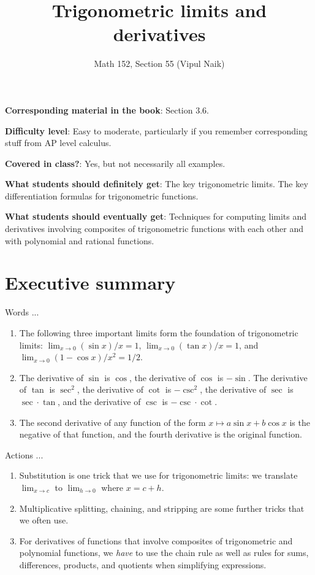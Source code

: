 \documentclass[10pt]{amsart}
\title{Trigonometric limits and derivatives}
\author{Math 152, Section 55 (Vipul Naik)}
\begin{document}
\maketitle

{\bf Corresponding material in the book}: Section 3.6.

{\bf Difficulty level}: Easy to moderate, particularly if you remember
corresponding stuff from AP level calculus.

{\bf Covered in class?}: Yes, but not necessarily all examples.

{\bf What students should definitely get}: The key trigonometric
limits. The key differentiation formulas for trigonometric functions.

{\bf What students should eventually get}: Techniques for computing
limits and derivatives involving composites of trigonometric functions
with each other and with polynomial and rational functions.

\section*{Executive summary}

Words ...

\begin{enumerate}
\item The following three important limits form the foundation of
  trigonometric limits: $\lim_{x \to 0} (\sin x)/x = 1$, $\lim_{x \to
  0} (\tan x)/x = 1$, and $\lim_{x \to 0} (1 - \cos x)/x^2 = 1/2$.
\item The derivative of $\sin$ is $\cos$, the derivative of $\cos$ is
  $-\sin$. The derivative of $\tan$ is $\sec^2$, the derivative of
  $\cot$ is $-\csc^2$, the derivative of $\sec$ is $\sec \cdot \tan$,
  and the derivative of $\csc$ is $-\csc \cdot \cot$.
\item The second derivative of any function of the form $x \mapsto
  a\sin x + b \cos x$ is the negative of that function, and the fourth
  derivative is the original function.
\end{enumerate}

Actions ...

\begin{enumerate}
\item Substitution is one trick that we use for trigonometric limits:
  we translate $\lim_{x \to c}$ to $\lim_{h \to 0}$ where $x = c + h$.
\item Multiplicative splitting, chaining, and stripping are some
  further tricks that we often use.
\item For derivatives of functions that involve composites of
  trigonometric and polynomial functions, we {\em have} to use the
  chain rule as well as rules for sums, differences, products, and
  quotients when simplifying expressions.
\end{enumerate}
\end{document}
